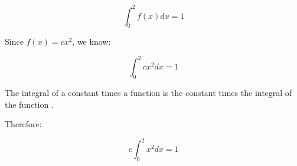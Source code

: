 \documentclass[a4paper,11pt]{article}
\begin{document}
\begin{equation}
  \int_{0}^{2} f \left( x \right) dx = 1
\end{equation}

Since $f \left( x \right) = cx^{2}$, we know:

\begin{equation}
  \int_{0}^{2}  cx^{2} dx = 1
\end{equation}

The integral of a constant times a function is the constant times the
integral of the function \cite{proofIntProps}.

Therefore:

\begin{equation}
  c \int_{0}^{2}  x^{2} dx = 1
\end{equation}


\printbibliography{}
\end{document}
